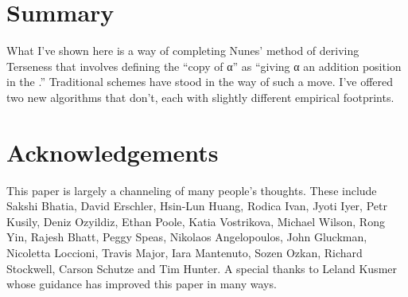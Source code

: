 \documentclass[output=paper]{langsci/langscibook}
\begin{document}

\section{Summary} %
\label{sec:30.summary}

What I've shown here is a way of completing Nunes' method of deriving Terseness
that involves defining the ``copy of α'' as ``giving α an addition position in
the .'' Traditional  schemes have stood in the
way of such a move. I've offered two new  algorithms that
don't, each with slightly different empirical footprints.



\printchapterglossary{}

\section*{Acknowledgements}

This paper is largely a channeling of many people's thoughts. These include
Sakshi Bhatia, David Erschler, Hsin-Lun Huang, Rodica Ivan, Jyoti Iyer, Petr
Kusily, Deniz Ozyildiz, Ethan Poole, Katia Vostrikova, Michael Wilson, Rong
Yin, Rajesh Bhatt, Peggy Speas, Nikolaos Angelopoulos, John Gluckman, Nicoletta
Loccioni, Travis Major, Iara Mantenuto, Sozen Ozkan, Richard Stockwell, Carson
Schutze and Tim Hunter. A special thanks to Leland Kusmer whose guidance has
improved this paper in many ways.

{\sloppy
\printbibliography[heading=subbibliography,notkeyword=this]
}
\end{document}
